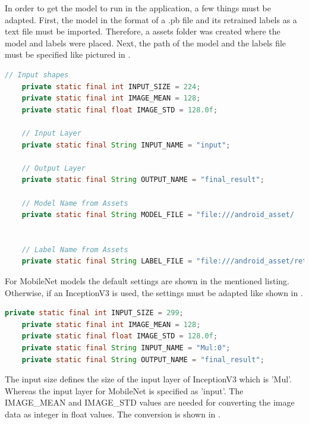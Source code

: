 In order to get the model to run in the application, a few things must be adapted. First, the model in the format of a .pb file and its retrained labels as a text file must be imported. Therefore, a assets folder was created where the model and labels were placed. Next, the path of the model and the labels file must be specified like pictured in .

\begin{lstlisting}[caption=Including the model in the mobile application, label=list:include_model, language=java]
    // Input shapes
    private static final int INPUT_SIZE = 224;
    private static final int IMAGE_MEAN = 128;
    private static final float IMAGE_STD = 128.0f;

    // Input Layer
    private static final String INPUT_NAME = "input";

    // Output Layer
    private static final String OUTPUT_NAME = "final_result";

    // Model Name from Assets
    private static final String MODEL_FILE = "file:///android_asset/				opt4_retrained_dog_graph_mobilenet_0.50_224_700_0.007.pb";


    // Label Name from Assets
    private static final String LABEL_FILE = "file:///android_asset/retrained_dog_labels_mobilenet_0.50_224_700_0.007.txt";

\end{lstlisting}

For MobileNet models the default settings are shown in the mentioned listing. Otherwise, if an InceptionV3 is used, the settings must be adapted like shown in .

\begin{lstlisting}[caption=Setup for InceptionV3, label=list:include_inception, language=java]
    private static final int INPUT_SIZE = 299;
    private static final int IMAGE_MEAN = 128;
    private static final float IMAGE_STD = 128.0f;
    private static final String INPUT_NAME = "Mul:0";
    private static final String OUTPUT_NAME = "final_result";
\end{lstlisting}

The input size defines the size of the input layer of InceptionV3 which is 'Mul'. Whereas the input layer for MobileNet is specified as 'input'. The IMAGE_MEAN and IMAGE_STD values are needed for converting the image data as integer in float values. The conversion is shown in .

